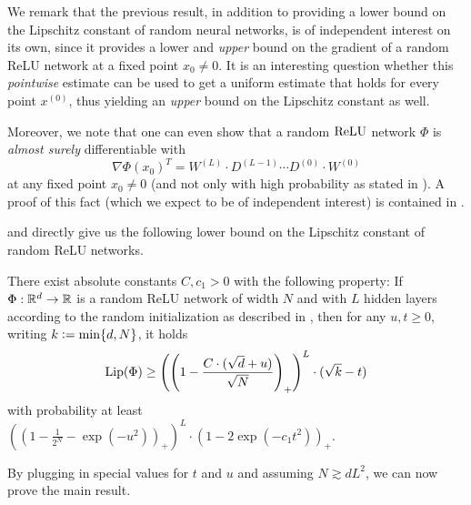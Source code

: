 We remark that the previous result, in addition to providing a lower bound on the Lipschitz constant of random neural networks, is of independent interest on its own,
since it provides a lower and \emph{upper} bound on the gradient of a random ReLU network at a fixed point $x_0\neq 0$. 
It is an interesting question whether this \emph{pointwise} estimate can be used to get a uniform estimate that holds for every point $x^{(0)}$,
thus yielding an \emph{upper} bound on the Lipschitz constant as well.

Moreover, we note that one can even show that a random $\operatorname{ReLU}$ network $\Phi$ is \emph{almost surely} differentiable with 
\begin{equation*}
\nabla \Phi (x_0)^T = W^{(L)} \cdot D^{(L-1)} \cdots D^{(0)} \cdot W^{(0)}
\end{equation*} 
at any fixed point $x_0 \neq 0$ (and not only with high probability as stated in ). 
A proof of this fact (which we expect to be of independent interest) is contained in .

 and  directly give us the following lower bound on the Lipschitz constant of random ReLU networks.
\begin{theorem}\label{thm:low_bound_ut}
There exist absolute constants $C, c_1 > 0$ with the following property: If $\Phi:\mathbb{R}^d \to \mathbb{R}$ is a random ReLU network of width $N$ and with $L$ hidden layers according to the random initialization as described in , then for any $u,t \geq 0$, writing $k \mathrel{\mathop:}= \min\{d,N\}$, it holds
\begin{equation*}
\operatorname{Lip}(\Phi) \geq \left(\left(1 - \frac{C\cdot(\sqrt{d} + u)}{\sqrt{N}}\right)_+\right)^{L} \cdot (\sqrt{k} - t) 
\end{equation*}
with probability at least $ \left(\left(1 - \frac{1}{2^N}-\exp(-u^2)\right)_+\right)^L \cdot (1- 2 \exp (-c_1 t^2))_+$.
\end{theorem}

 By plugging in special values for $t$ and $u$ and assuming $N \gtrsim dL^2$, we can now prove the main result.

